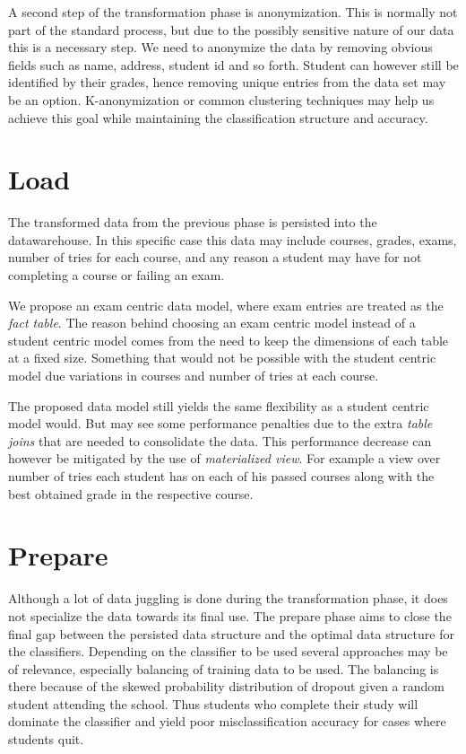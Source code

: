 \bigskip\noindent
A second step of the transformation phase is anonymization. 
This is normally not part of the standard process, but due to the possibly sensitive nature of our data this is a necessary step.
We need to anonymize the data by removing obvious fields such as name, address, student id and so forth. 
Student can however still be identified by their grades, hence removing unique entries from the data set may be an option.
K-anonymization or common clustering techniques may help us achieve this goal while maintaining the classification structure and accuracy.

\section{Load}
The transformed data from the previous phase is persisted into the datawarehouse. 
In this specific case this data may include courses, grades, exams, number of tries for each course, 
and any reason a student may have for not completing a course or failing an exam.

\bigskip\noindent
We propose an exam centric data model, where exam entries are treated as the \textit{fact table}. 
The reason behind choosing an exam centric model instead of a student centric model comes from the
need to keep the dimensions of each table at a fixed size. Something that would not be possible 
with the student centric model due variations in courses and number of tries at each course.

\noindent
The proposed data model still yields the same flexibility as a student centric model would. 
But may see some performance penalties due to the extra \textit{table joins} that are needed to consolidate the data.
This performance decrease can however be mitigated by the use of \textit{materialized view}.
For example a view over number of tries each student has on each of his passed courses along with the best obtained grade in the respective course.

\section{Prepare}
Although a lot of data juggling is done during the transformation phase, it does not specialize the data towards its final use. 
The prepare phase aims to close the final gap between the persisted data structure and the optimal data structure for the classifiers.
Depending on the classifier to be used several approaches may be of relevance, especially balancing of training data to be used.
The balancing is there because of the skewed probability distribution of dropout given a random student attending the school.
Thus students who complete their study will dominate the classifier and yield poor misclassification accuracy for cases where students quit.

